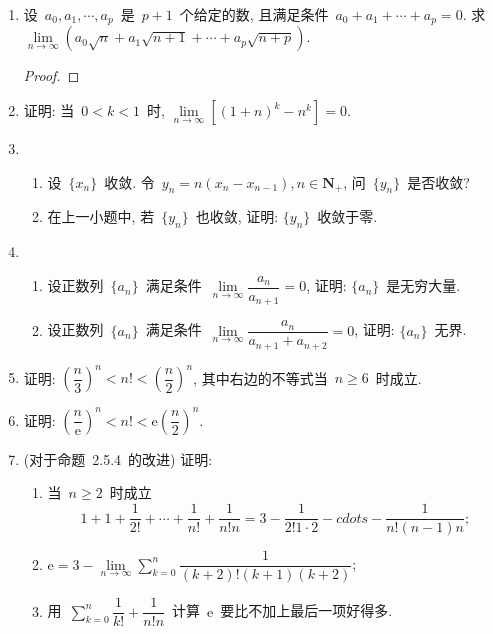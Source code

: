 \documentclass[UTF8,a4paper,10pt,twoside]{book}
\newcommand{\e}{\mathrm e}
\begin{document}
\begin{enumerate}
	\item 设~$a_0, a_1, \cdots ,a_p$~是~$p+1$~个给定的数, 且满足条件~$a_0+a_1+\cdots+a_p=0$. 求~$\lim\limits_{n\to\infty} (a_0\sqrt{n}+a_1\sqrt{n+1}+\cdots+a_p\sqrt{n+p})$.
	      \begin{proof}

	      \end{proof}

	\item 证明: 当~$0<k<1$~时, $\lim\limits_{n\to\infty} [(1+n)^k-n^k]=0$.

	\item
	      \begin{enumerate}[(1)]
		      \item 设~$\{x_n\}$~收敛. 令~$y_n=n(x_n-x_{n-1}), n\in\mathbf{N}_{+}$, 问~$\{y_n\}$~是否收敛?
		      \item 在上一小题中, 若~$\{y_n\}$~也收敛, 证明: $\{y_n\}$~收敛于零.
	      \end{enumerate}

	\item
	      \begin{enumerate}[(1)]
		      \item 设正数列~$\{a_n\}$~满足条件~$\lim\limits_{n\to\infty} \dfrac{a_n}{a_{n+1}}=0$, 证明: $\{a_n\}$~是无穷大量.
		      \item 设正数列~$\{a_n\}$~满足条件~$\lim\limits_{n\to\infty} \dfrac{a_n}{a_{n+1}+a_{n+2}}=0$, 证明: $\{a_n\}$~无界.
	      \end{enumerate}

	\item 证明: $\left(\dfrac{n}{3}\right)^n<n!<\left(\dfrac{n}{2}\right)^n$, 其中右边的不等式当~$n\geqslant 6$~时成立.

	\item 证明: $\left(\dfrac{n}{\e}\right)^n<n!<\e\left(\dfrac{n}{2}\right)^n$.

	\item (对于命题~2.5.4~的改进) 证明:
	      \begin{enumerate}[(1)]
		      \item  当~$n\geqslant 2$~时成立
		            \[
			            1+1+\dfrac{1}{2!}+\cdots+\dfrac{1}{n!}+\dfrac{1}{n!n}=3-\dfrac{1}{2!1\cdot 2}-cdots-\dfrac{1}{n!(n-1)n};
		            \]
		      \item $\e=3-\lim\limits_{n\to\infty} \displaystyle\sum_{k=0}^n\dfrac{1}{(k+2)!(k+1)(k+2)}$;
		      \item 用~$\displaystyle \sum\limits_{k=0}^n\dfrac{1}{k!}+\dfrac{1}{n!n}$~计算~$\e$~要比不加上最后一项好得多.
	      \end{enumerate}


\end{enumerate}
\end{document}
